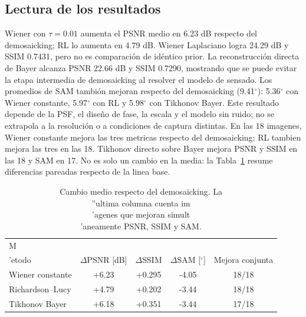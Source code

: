 \documentclass[11pt,a4paper]{article}
\begin{document}
\subsection{Lectura de los resultados}
Wiener con $\tau=0.01$ aumenta el PSNR medio en 6.23 dB respecto del demosaicking; RL lo aumenta en 4.79 dB. Wiener Laplaciano logra 24.29 dB y SSIM 0.7431, pero no es comparaci\'on de id\'entico prior. La reconstrucci\'on directa de Bayer alcanza PSNR 22.66 dB y SSIM 0.7290, mostrando que se puede evitar la etapa intermedia de demosaicking al resolver el modelo de sensado. Los promedios de SAM tambi\'on mejoran respecto del demosaicking (9.41$^{\circ}$): 5.36$^{\circ}$ con Wiener constante, 5.97$^{\circ}$ con RL y 5.98$^{\circ}$ con Tikhonov Bayer. Este resultado depende de la PSF, el dise\~no de fase, la escala y el modelo sin ruido; no se extrapola a la resoluci\'on o a condiciones de captura distintas.
En las 18 imagenes, Wiener constante mejora las tres metricas respecto del demosaicking; RL tambien mejora las tres en las 18. Tikhonov directo sobre Bayer mejora PSNR y SSIM en las 18 y SAM en 17. No es solo un cambio en la media: la Tabla~\ref{tab:ganancias} resume diferencias pareadas respecto de la linea base.
\begin{table}[H]\centering\small
\caption{Cambio medio respecto del demosaicking. La \\''ultima columna cuenta im\\'agenes que mejoran simult\\'aneamente PSNR, SSIM y SAM.}
\label{tab:ganancias}\begin{tabular}{lcccc}\toprule
M\\'etodo & $\Delta$PSNR [dB] & $\Delta$SSIM & $\Delta$SAM [$^\circ$] & Mejora conjunta \tabularnewline\midrule
Wiener constante & +6.23 & +0.295 & -4.05 & 18/18 \tabularnewline
Richardson--Lucy & +4.79 & +0.202 & -3.44 & 18/18 \tabularnewline
Tikhonov Bayer & +6.18 & +0.351 & -3.44 & 17/18 \tabularnewline\bottomrule\end{tabular}\end{table}
\end{document}
